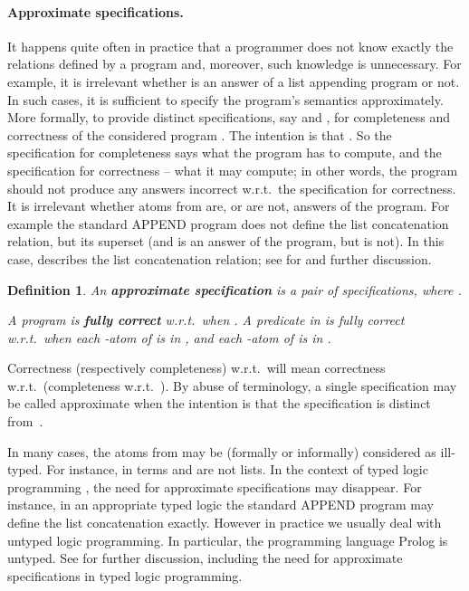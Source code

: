 \documentclass{tlp}
\newtheorem{definition}[theorem]{Definition}
\begin{document}


\paragraph{Approximate specifications.}
It happens quite often in practice that a programmer
does not know exactly the relations defined by a program
and, moreover, such knowledge is unnecessary.
For example, it is irrelevant whether 
 is an answer of a list appending program or not.
In such cases, it is
 sufficient to specify the program's semantics approximately.
More formally, to provide distinct specifications, say
 and , for completeness and correctness
of the considered program .
The intention is that  .
So the specification for completeness says what the program has to compute,
and the specification for correctness -- what it may compute;
in other words, the program should not produce any answers
incorrect w.r.t.\ the specification for correctness. 
It is irrelevant whether atoms from 
 are, or are not, answers of the program.
For example the standard \mbox{APPEND} program does not define the list
concatenation relation, but its superset
(and  is an answer of the program,
but  is not).
In this case,  describes the list concatenation relation;
see \cite{drabent.tocl16}
for   and further discussion.





\begin{definition}
An {\bf approximate specification} is 
a pair  of specifications, where
.

A program  is {\bf fully correct} w.r.t.\  
when  .
A predicate  in  is fully correct w.r.t.\ 
when each -atom of  is in ,
and each -atom of  is in .
\end{definition}
Correctness (respectively completeness) w.r.t.\ 
 will mean
correctness w.r.t.\  (completeness w.r.t.\ ). 
By abuse of terminology,
a single specification may be called
approximate when the intention is that the specification is
distinct from~.






In many cases, the atoms from  
may be (formally or informally) considered as ill-typed.
For instance, in 
terms  and  are not lists. 
In the context of typed logic programming \cite{types.lp.92-short},
the need for approximate specifications may disappear.
For instance, in an appropriate
typed logic the standard APPEND program may define the list concatenation exactly.
However in practice we usually deal with untyped logic programming.
In particular, the programming language Prolog is untyped.
See \cite{drabent.tocl16} for further discussion, including the need
for approximate specifications in typed logic programming. 
\end{document}
